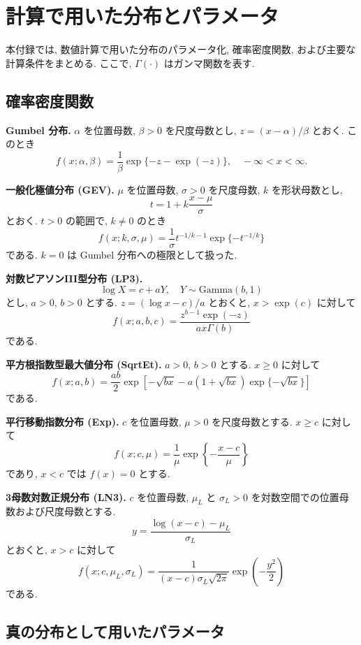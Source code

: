 \section{計算で用いた分布とパラメータ}
\label{app:distribution_defs}

\begingroup
\small

本付録では, 数値計算で用いた分布のパラメータ化, 確率密度関数, および主要な計算条件をまとめる. 
ここで, \(\Gamma(\cdot)\) はガンマ関数を表す.

\subsection{確率密度関数}

\noindent\textbf{Gumbel 分布.}
\(\alpha\) を位置母数, \(\beta>0\) を尺度母数とし, \(z=(x-\alpha)/\beta\) とおく. 
このとき
\[
f(x;\alpha,\beta)
=
\frac{1}{\beta}
\exp\{-z-\exp(-z)\},
\quad -\infty<x<\infty .
\]

\noindent\textbf{一般化極値分布 (GEV).}
\(\mu\) を位置母数, \(\sigma>0\) を尺度母数, \(k\) を形状母数とし,
\[
t=1+k\frac{x-\mu}{\sigma}
\]
とおく. 
\(t>0\) の範囲で, \(k\ne0\) のとき
\[
f(x;k,\sigma,\mu)
=
\frac{1}{\sigma}
t^{-1/k-1}
\exp\{-t^{-1/k}\}
\]
である. 
\(k=0\) は Gumbel 分布への極限として扱った.

\noindent\textbf{対数ピアソンIII型分布 (LP3).}
\[
\log X = c + aY,\quad Y\sim \mathrm{Gamma}(b,1)
\]
とし, \(a>0\), \(b>0\) とする. 
\(z=(\log x-c)/a\) とおくと, \(x>\exp(c)\) に対して
\[
f(x;a,b,c)
=
\frac{z^{b-1}\exp(-z)}
{a x \Gamma(b)}
\]
である.

\noindent\textbf{平方根指数型最大値分布 (SqrtEt).}
\(a>0\), \(b>0\) とする. 
\(x\ge0\) に対して
\[
f(x;a,b)
=
\frac{ab}{2}
\exp\left[
-\sqrt{bx}
-a\left(1+\sqrt{bx}\right)\exp\{-\sqrt{bx}\}
\right]
\]
である.

\noindent\textbf{平行移動指数分布 (Exp).}
\(c\) を位置母数, \(\mu>0\) を尺度母数とする. 
\(x\ge c\) に対して
\[
f(x;c,\mu)
=
\frac{1}{\mu}
\exp\left\{-\frac{x-c}{\mu}\right\}
\]
であり, \(x<c\) では \(f(x)=0\) とする.

\noindent\textbf{3母数対数正規分布 (LN3).}
\(c\) を位置母数, \(\mu_L\) と \(\sigma_L>0\) を対数空間での位置母数および尺度母数とする. 
\[
y=\frac{\log(x-c)-\mu_L}{\sigma_L}
\]
とおくと, \(x>c\) に対して
\[
f(x;c,\mu_L,\sigma_L)
=
\frac{1}{(x-c)\sigma_L\sqrt{2\pi}}
\exp\left(-\frac{y^2}{2}\right)
\]
である.

\subsection{真の分布として用いたパラメータ}

